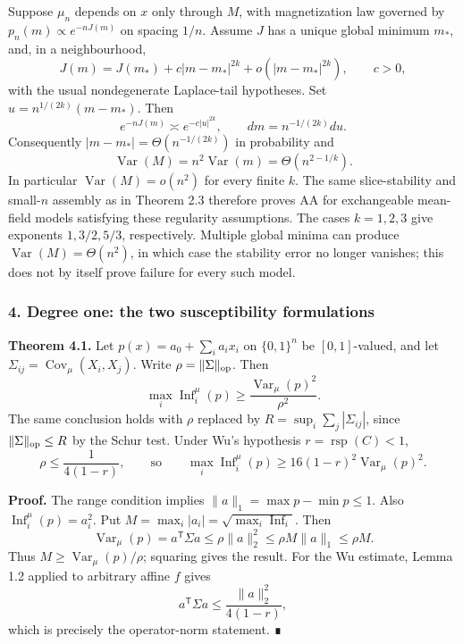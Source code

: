 Suppose \(\mu_n\) depends on \(x\) only through \(M\), with magnetization law governed by \(p_n(m)\propto e^{-nJ(m)}\) on spacing \(1/n\). Assume \(J\) has a unique global minimum \(m_*\), and, in a neighbourhood,
\[J(m)=J(m_*)+c|m-m_*|^{2k}+o(|m-m_*|^{2k}),\qquad c>0,\]
with the usual nondegenerate Laplace-tail hypotheses. Set \(u=n^{1/(2k)}(m-m_*)\). Then
\[e^{-nJ(m)}\asymp e^{-c|u|^{2k}},\qquad dm=n^{-1/(2k)}du.\]
Consequently \(|m-m_*|=\Theta(n^{-1/(2k)})\) in probability and
\[\operatorname{Var}(M)=n^2\operatorname{Var}(m)=\Theta(n^{2-1/k}).\]
In particular \(\operatorname{Var}(M)=o(n^2)\) for every finite \(k\). The same slice-stability and small-\(n\) assembly as in Theorem 2.3 therefore proves AA for exchangeable mean-field models satisfying these regularity assumptions. The cases \(k=1,2,3\) give exponents \(1,3/2,5/3\), respectively. Multiple global minima can produce \(\operatorname{Var}(M)=\Theta(n^2)\), in which case the stability error no longer vanishes; this does not by itself prove failure for every such model.

\subsubsection{4. Degree one: the two susceptibility formulations}\label{degree-one-the-two-susceptibility-formulations}

\textbf{Theorem 4.1.} Let \(p(x)=a_0+\sum_i a_ix_i\) on \(\{0,1\}^n\) be \([0,1]\)-valued, and let \(\Sigma_{ij}=\operatorname{Cov}_\mu(X_i,X_j)\). Write \(\rho=\|\Sigma\|_{\rm op}\). Then
\[\max_i\operatorname{Inf}_i^\mu(p)\ge\frac{\operatorname{Var}_\mu(p)^2}{\rho^2}.\]
The same conclusion holds with \(\rho\) replaced by \(R=\sup_i\sum_j|\Sigma_{ij}|\), since \(\|\Sigma\|_{\rm op}\le R\) by the Schur test. Under Wu's hypothesis \(r=\operatorname{rsp}(C)<1\),
\[\rho\le\frac{1}{4(1-r)},\qquad\text{so}\qquad
\max_i\operatorname{Inf}_i^\mu(p)\ge16(1-r)^2\operatorname{Var}_\mu(p)^2.\]

\textbf{Proof.} The range condition implies \(\|a\|_1=\max p-\min p\le1\). Also \(\operatorname{Inf}_i^\mu(p)=a_i^2\). Put \(M=\max_i|a_i|=\sqrt{\max_i\operatorname{Inf}_i}\). Then
\[
\operatorname{Var}_\mu(p)=a^{\mathsf T}\Sigma a
\le\rho\|a\|_2^2
\le\rho M\|a\|_1
\le\rho M.
\]
Thus \(M\ge\operatorname{Var}_\mu(p)/\rho\); squaring gives the result.
For the Wu estimate, Lemma 1.2 applied to arbitrary affine \(f\) gives
\[a^{\mathsf T}\Sigma a\le\frac{\|a\|_2^2}{4(1-r)},\]
which is precisely the operator-norm statement. ∎

